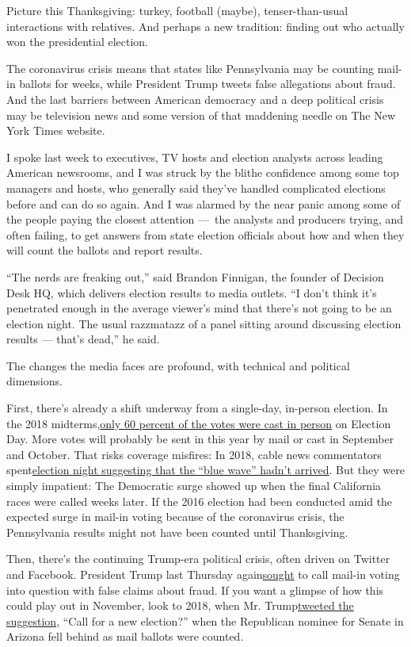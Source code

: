 Picture this Thanksgiving: turkey, football (maybe), tenser-than-usual
interactions with relatives. And perhaps a new tradition: finding out
who actually won the presidential election.

The coronavirus crisis means that states like Pennsylvania may be
counting mail-in ballots for weeks, while President Trump tweets false
allegations about fraud. And the last barriers between American
democracy and a deep political crisis may be television news and some
version of that maddening needle on The New York Times website.

I spoke last week to executives, TV hosts and election analysts across
leading American newsrooms, and I was struck by the blithe confidence
among some top managers and hosts, who generally said they've handled
complicated elections before and can do so again. And I was alarmed by
the near panic among some of the people paying the closest attention
---~the analysts and producers trying, and often failing, to get answers
from state election officials about how and when they will count the
ballots and report results.

``The nerds are freaking out,'' said Brandon Finnigan, the founder of
Decision Desk HQ, which delivers election results to media outlets. ``I
don't think it's penetrated enough in the average viewer's mind that
there's not going to be an election night. The usual razzmatazz of a
panel sitting around discussing election results --- that's dead,'' he
said.

The changes the media faces are profound, with technical and political
dimensions.

First, there's already a shift underway from a single-day, in-person
election. In the 2018
midterms,\href{https://www.census.gov/library/stories/2019/04/behind-2018-united-states-midterm-election-turnout.html}{only
60 percent of the votes were cast in person} on Election Day. More votes
will probably be sent in this year by mail or cast in September and
October. That risks coverage misfires: In 2018, cable news commentators
spent\href{https://www.youtube.com/watch?v=T6FQmy-1Cfc}{election night
suggesting that the ``blue wave'' hadn't arrived}. But they were simply
impatient: The Democratic surge showed up when the final California
races were called weeks later. If the 2016 election had been conducted
amid the expected surge in mail-in voting because of the coronavirus
crisis, the Pennsylvania results might not have been counted until
Thanksgiving.

Then, there's the continuing Trump-era political crisis, often driven on
Twitter and Facebook. President Trump last Thursday
again\href{https://www.nytimes3xbfgragh.onion/2020/07/30/us/elections/biden-vs-trump.html}{sought}
to call mail-in voting into question with false claims about fraud. If
you want a glimpse of how this could play out in November, look to 2018,
when Mr.
Trump\href{https://twitter.com/realDonaldTrump/status/1060993836984324096}{tweeted
the suggestion}, ``Call for a new election?'' when the Republican
nominee for Senate in Arizona fell behind as mail ballots were counted.

